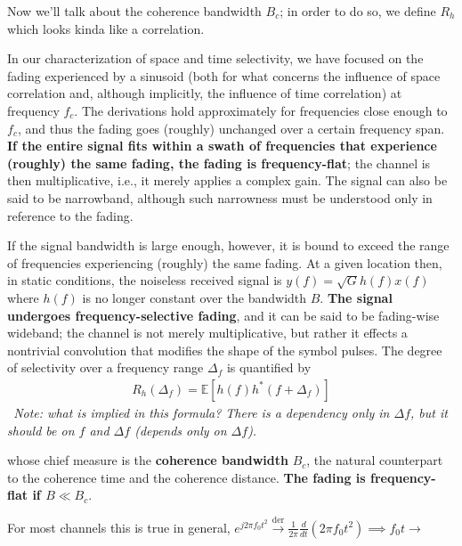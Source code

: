 \documentclass[a4paper, 12pt]{book}
\begin{document}
Now we'll talk about the coherence bandwidth $B_c$; in order to do so, we define $R_h$ which looks kinda like a correlation.

\begin{yellowbox}
In our characterization of space and time selectivity, we have focused on the fading experienced by a sinusoid (both for what concerns the influence of {\color{green!60!black} space correlation} and, although implicitly, the influence of {\color{green!60!black} time correlation}) at frequency $f_c$. The derivations hold approximately for frequencies close enough to $f_c$, and thus the fading goes (roughly) unchanged over a certain frequency span. \textbf{If the entire signal fits within a swath of frequencies that experience (roughly) the same fading, the fading is frequency-flat}; the channel is then multiplicative, i.e., it merely applies a complex gain. The signal can also be said to be narrowband, although such narrowness must be understood only in reference to the fading.
\end{yellowbox}

\begin{yellowbox}
If the signal bandwidth is large enough, however, it is bound to exceed the range of frequencies experiencing (roughly) the same fading. At a given location then, in static conditions, the noiseless received signal is $y(f) = \sqrt{G} h(f) x(f)$ where $h(f)$ is no longer constant over the bandwidth $B$. \textbf{The signal undergoes frequency-selective fading}, and it can be said to be fading-wise wideband; the channel is not merely multiplicative, but rather it effects a nontrivial convolution that modifies the shape of the symbol pulses. The degree of selectivity over a frequency range $\Delta_f$ is quantified by
\begin{align}
    R_h(\Delta_f) = \mathbb{E}[h(f)h^*(f+\Delta_f)]
\end{align}
\textit{\color{red} \faPen\ Note: what is implied in this formula? There is a dependency only in $\Delta f$, but it should be on $f$ and $\Delta f$ (depends only on $\Delta f$).}

whose chief measure is the \textbf{coherence bandwidth} $B_c$, the natural counterpart to the coherence time and the coherence distance. \textbf{The fading is frequency-flat if $B \ll B_c$}.
\end{yellowbox}

\begin{purplebox}
For most channels this is true in general,
$e^{j2\pi f_0 t^2} \xrightarrow{\text{der}} \frac{1}{2\pi}\frac{d}{dt}(2\pi f_0 t^2) \implies f_0 t \to$ 
\end{purplebox}
\end{document}
